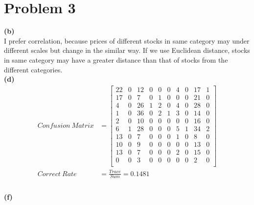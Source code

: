 \documentclass[11pt]{scrartcl}
\begin{document}
\section*{Problem 3}
\textbf{(b)}\\
I prefer correlation, because prices of different stocks in same category may under different scales but change in the similar way. If we use Euclidean distance, stocks in same category may have a greater distance than that of stocks from the different categories.\\
\textbf{(d)}\\
\begin{equation*}
\begin{aligned}
Confusion\ Matrix&=
\begin{bmatrix}
 22 &  0 & 12 &  0 &  0 &  0 &  4 &  0 & 17 &  1\\
 17 &  0 &  7 &  0 &  1 &  0 &  0 &  0 & 21 &  0\\
  4 &  0 & 26 &  1 &  2 &  0 &  4 &  0 & 28 &  0\\
  1 &  0 & 36 &  0 &  2 &  1 &  3 &  0 & 14 &  0\\
  2 &  0 & 10 &  0 &  0 &  0 &  0 &  0 & 16 &  0\\
  6 &  1 & 28 &  0 &  0 &  0 &  5 &  1 & 34 &  2\\
 13 &  0 &  7 &  0 &  0 &  0 &  1 &  0 &  8 &  0\\
 10 &  0 &  9 &  0 &  0 &  0 &  0 &  0 & 13 &  0\\
 13 &  0 &  7 &  0 &  0 &  0 &  2 &  0 & 15 &  0\\
  0 &  0 &  3 &  0 &  0 &  0 &  0 &  0 &  2 &  0\\
\end{bmatrix}\\
Correct\ Rate&=\frac{Trace}{Sum}=0.1481\\
\end{aligned}
\end{equation*}\\
\textbf{(f)}\\
\end{document}
